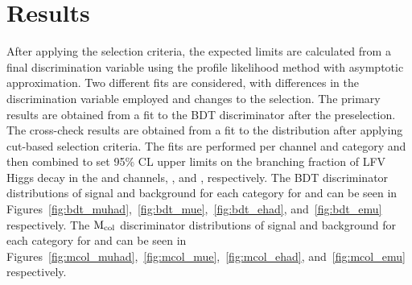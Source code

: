 %
%

\chapter{Results}
\label{results}

After applying the selection criteria, the expected limits are calculated from a final discrimination variable using the profile likelihood method with asymptotic approximation. Two different fits are considered, with differences in the discrimination variable employed and changes to the selection. The primary results are obtained from a fit to the BDT discriminator after the preselection. The cross-check results are obtained from a fit to the \mcol distribution after applying cut-based selection criteria. The fits are performed per channel and category and then combined to set 95\% CL upper limits on the branching fraction of LFV Higgs decay in the \Hmt and \Het channels, \BHmt, and \BHet, respectively. The BDT discriminator distributions of signal and background for each category for \Hmt and \Het can be seen in Figures~\ref{fig:bdt_muhad},~\ref{fig:bdt_mue},~\ref{fig:bdt_ehad}, and~\ref{fig:bdt_emu} respectively. The $\text{M}_{\text{col}}$ discriminator distributions of signal and background for each category for \Hmt and \Het can be seen in Figures~\ref{fig:mcol_muhad},~\ref{fig:mcol_mue},~\ref{fig:mcol_ehad}, and~\ref{fig:mcol_emu} respectively.

